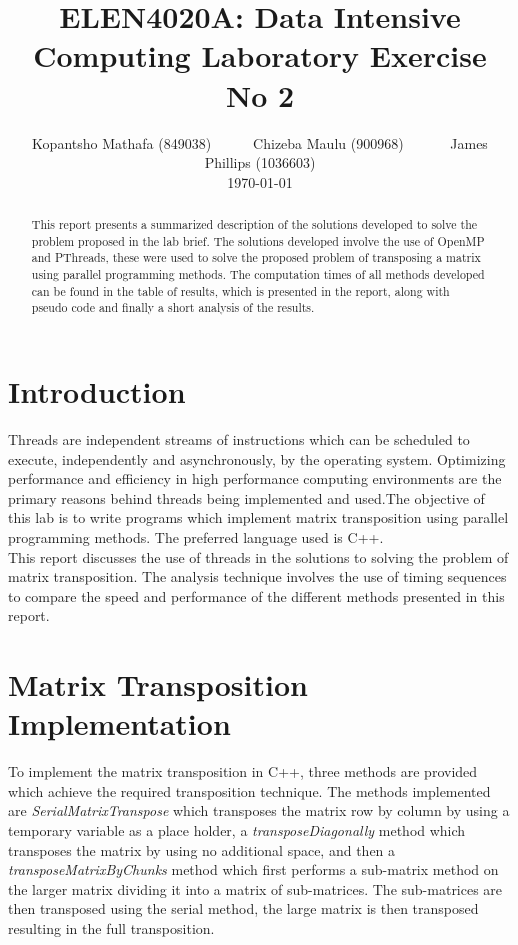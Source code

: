 \documentclass[a4paper, 11pt, onecolumn, conference]{IEEEtran}      %
\title{\LARGE \bf
ELEN4020A: Data Intensive Computing Laboratory Exercise No 2
}
\author{ Kopantsho Mathafa (849038)\ \ \ \ \ \ Chizeba Maulu (900968) \ \ \ \ \ \ James Phillips (1036603) \\ \today \\
}
\begin{document}
\maketitle

\begin{abstract}
    This report presents a summarized description of the solutions developed to solve the problem proposed in the lab brief. The solutions developed involve the use of OpenMP and PThreads, these were used to solve the proposed problem of transposing a matrix using parallel programming methods. The computation times of all methods developed can be found in the table of results, which is presented in the report, along with pseudo code and finally a short analysis of the results.
\end{abstract}

\section{Introduction}
Threads are independent streams of instructions which can be scheduled to execute, independently and asynchronously, by the operating system. Optimizing performance and efficiency in high performance computing environments are the primary reasons behind threads being implemented and used.The objective of this lab is to write programs which implement matrix transposition using parallel programming methods. The preferred language used is C++.\\

This report discusses the use of threads in the solutions to solving the problem of matrix transposition. The analysis technique involves the use of timing sequences to compare the speed and performance of the different methods presented in this report. 

\section{Matrix Transposition Implementation}
To implement the matrix transposition in C++, three methods are provided which achieve the required transposition technique. The methods implemented are \textit{SerialMatrixTranspose} which transposes the matrix row by column by using a temporary variable as a place holder, a \textit{transposeDiagonally} method which transposes the matrix by using no additional space, and then a \textit{transposeMatrixByChunks} method which first performs a sub-matrix method on the larger matrix dividing it into a matrix of sub-matrices. The sub-matrices are then transposed using the serial method, the large matrix is then transposed resulting in the full transposition.\\
\end{document}
